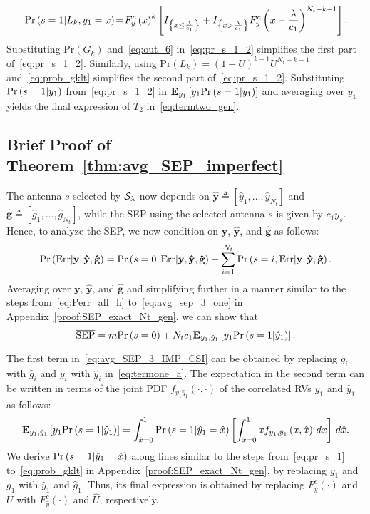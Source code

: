 \documentclass[12pt,draftcls,peerreview,onecolumn]{IEEEtran}
\newcommand{\brac}[1]{\left({#1}\right)}
\newcommand{\cbrac}[1]{\left\{{#1}\right\}}
\newcommand{\indic}[1]{I_{\cbrac{#1}}}
\newcommand{\define}{\triangleq}
\newcommand{\explow}[2]{{\bf{E}}_{#1}\left[{#2}\right]}
\newcommand{\prob}[1]{\text{Pr}\brac{#1}}
\newcommand{\given}{\arrowvert}
\newcommand{\SEP}{\text{SEP}}
\newcommand{\y}{\mathbf{y}}
\newcommand{\nx}{{0}}
\newcommand{\setG}{G}
\newcommand{\setL}{L}
\newcommand{\setGk}{\setG_k}
\newcommand{\setLk}{\setL_k}
\newcommand{\lam}{\lambda}
\newcommand{\Err}{{\text{Err}}}
\newcommand{\termtwo}{T_2}
\newcommand{\Nt}{{N_t}}
\newcommand{\puch}{g}
\newcommand{\gk}[1]{{\puch_{#1}}}
\newcommand{\ghatvec}{\mathbf{\hat{\puch}}}
\newcommand{\yhatvec}{\mathbf{\hat{y}}}
\newcommand{\cone}{c_{1}}
\newcommand{\m}{\cone}
\newcommand{\lambym}{\frac{\lam}{\m}}
\newcommand{\yk}[1]{y_{#1}}
\newcommand{\un}{U}
\newcommand{\zerosep}{m}
\newcommand{\callamrule}{{\cal S_{{\lam}}}}
\newcommand{\avgSEP}{\overline{\SEP}}
\newcommand{\unhat}{\widehat{\un}}
\newcommand{\ghat}{\hat{\puch}}
\newcommand{\yhat}{\hat{y}}
\newcommand{\gkhat}[1]{\ghat_{#1}}
\newcommand{\ykhat}[1]{\hat{y}_{#1}}
\newcommand{\ccdfyrv}[1]{ F^{c}_{y}\left(#1 \right) }
\newcommand{\ccdfyhatrv}[1]{F^{c}_{\yhat}\left(#1 \right) }
\newcommand{\xhat}{\hat{x}}
\begin{document}
\begin{equation}
\text{Pr}\brac{s =1\given \setLk,\yk{1}=x} \!=\! F_{y}^{c}\brac{x}^{k}\left[\indic{x\leq\lambym} +\indic{x>\lambym}F_{y}^{c}\brac{x-\lambym}^{\Nt-k-1}\right].
\label{eq:prob_gklt}
\end{equation}
%
Substituting $\prob{\setGk}$ and~\eqref{eq:out_6} in~\eqref{eq:pr_s_1_2} simplifies the first part of~\eqref{eq:pr_s_1_2}. Similarly, using $\prob{\setLk}=\left(1-\un\right)^{k+1}\un^{\Nt-k-1}$ and~\eqref{eq:prob_gklt} simplifies the second part of~\eqref{eq:pr_s_1_2}. Substituting $\prob{s = 1\given \yk{1}}$ from~\eqref{eq:pr_s_1_2} in $\explow{\yk{1}}{ \yk{1}\prob{s = 1\given \yk{1}}}$ and averaging over $\yk{1}$ yields the final expression of $\termtwo$ in~\eqref{eq:termtwo_gen}. 


\subsection{Brief Proof of Theorem~\ref{thm:avg_SEP_imperfect}}
\label{proof:avg_SEP_imperfect_CSI}
The antenna $s$ selected by $\callamrule$  now depends on $\yhatvec\define\left[\ykhat{1},\ldots,\ykhat{\Nt} \right]$ and $\ghatvec\define\left[\gkhat{1},\ldots,\gkhat{\Nt} \right]$, while the SEP using the selected antenna $s$ is given by $\cone\yk{s}$.  Hence, to analyze the SEP, we now condition on $\y$, $\yhatvec$, and $\ghatvec$ as follows:
%
\begin{equation}
\prob{\Err \given \y,\yhatvec,\ghatvec} =  \prob{s=\nx,\Err\given \y, \yhatvec,\ghatvec} + \sum_{i=1}^{\Nt}\prob{s=i,\Err\given\y,\yhatvec,\ghatvec}.
\label{eq:Perr_all_imp_csi}
\end{equation}  
%
Averaging over $\y$, $\yhatvec$, and $\ghatvec$ and simplifying further in a manner similar to the steps from~\eqref{eq:Perr_all_h} to~\eqref{eq:avg_sep_3_one} in Appendix~\ref{proof:SEP_exact_Nt_gen}, we can show that
%
\begin{equation}
\label{eq:avg_SEP_3_IMP_CSI}
\avgSEP = \zerosep \prob{s=\nx} + \Nt\m\explow{\yk{1},\ykhat{1}}{\yk{1}\prob{s=1\given \ykhat{1}}}.
\end{equation}
%

The first term in~\eqref{eq:avg_SEP_3_IMP_CSI} can be obtained by replacing $\gk{i}$ with $\gkhat{i}$ and $\yk{i}$ with $\ykhat{i}$ in~\eqref{eq:termone_a}. The expectation in the second term can be written in terms of the joint PDF $f_{\yk{1}\ykhat{1}}\left(\cdot,\cdot\right)$ of the correlated RVs $\yk{1}$ and $\ykhat{1}$ as follows:
%
\begin{equation}
\label{eq:avg_SEP_4_IMP_CSI}
\explow{\yk{1},\ykhat{1}}{\yk{1}\prob{s=1\given \ykhat{1}}}= \int_{\xhat=0}^{1} \prob{s=1\given \ykhat{1}=\xhat} \left[ \int_{x=0}^{1} x  f_{\yk{1},\ykhat{1}}\left(x,\xhat\right)\,dx\right] \,d\xhat.
\end{equation}
%
We derive $\prob{s=1\given\ykhat{1}=\xhat}$ along lines similar to the steps from~\eqref{eq:pr_s_1} to~\eqref{eq:prob_gklt} in Appendix~\ref{proof:SEP_exact_Nt_gen},  by replacing $\yk{1}$ and $\gk{1}$ with $\ykhat{1}$ and $\gkhat{1}$. Thus, its final expression is obtained by replacing $\ccdfyrv{\cdot}$ and $\un$ with $\ccdfyhatrv{\cdot}$ and $\unhat$, respectively. 
\end{document}
